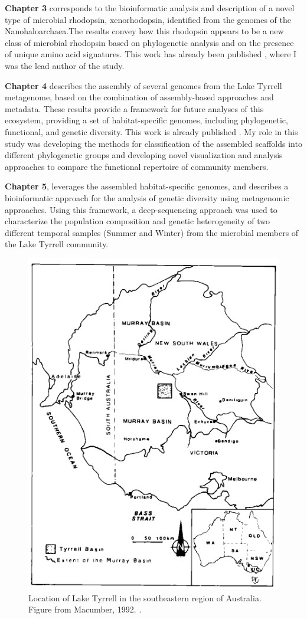 \textbf{Chapter 3} corresponds to the bioinformatic analysis and description of a novel type of microbial rhodopsin, xenorhodopsin, identified from the genomes of the Nanohaloarchaea.The results convey how this rhodopsin appears to be a new class of microbial rhodopsin based on phylogenetic analysis and on the presence of unique amino acid signatures. This work has already been published \cite{Ugalde:2011fw}, where I was the lead author of the study. 

\textbf{Chapter 4} describes the assembly of several genomes from the Lake Tyrrell metagenome, based on the combination of assembly-based approaches and metadata. These results provide a framework for future analyses of this ecosystem, providing a set of habitat-specific genomes, including phylogenetic, functional, and genetic diversity. This work is already published \cite{Podell:2013kx}. My role in this study was developing the methods for classification of the assembled scaffolds into different phylogenetic groups and developing novel visualization and analysis approaches to compare the functional repertoire of community members.

\textbf{Chapter 5}, leverages the assembled habitat-specific genomes, and describes a bioinformatic approach for the analysis of genetic diversity using metagenomic approaches. Using this framework, a deep-sequencing approach was used to characterize the population composition and genetic heterogeneity of two different temporal samples (Summer and Winter) from the microbial members of the Lake Tyrrell community.

\begin{figure}[!htbp]
	\centering
	\includegraphics[width=\textwidth]{Chapter1/Figures/LT_Map.pdf}
	\caption{Location of Lake Tyrrell in the southeastern region of Australia. Figure from Macumber, 1992. \cite{Macumber:1992ty}.}
	\label{LT_map}
\end{figure}

